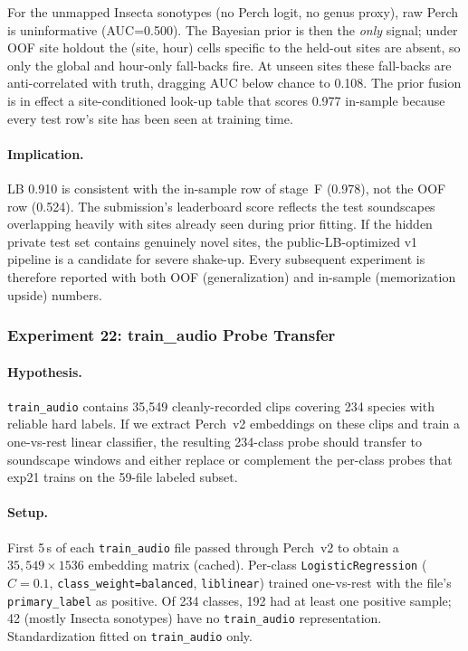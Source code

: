 For the unmapped Insecta sonotypes (no Perch logit, no genus proxy), raw
Perch is uninformative (AUC=0.500). The Bayesian prior is then the
\emph{only} signal; under OOF site holdout the (site, hour) cells specific
to the held-out sites are absent, so only the global and hour-only
fall-backs fire. At unseen sites these fall-backs are anti-correlated with
truth, dragging AUC below chance to 0.108. The prior fusion is in effect
a site-conditioned look-up table that scores 0.977 in-sample because every
test row's site has been seen at training time.

\paragraph{Implication.}
LB 0.910 is consistent with the in-sample row of stage~F (0.978), not the
OOF row (0.524). The submission's leaderboard score reflects the test
soundscapes overlapping heavily with sites already seen during prior
fitting. If the hidden private test set contains genuinely novel sites,
the public-LB-optimized v1 pipeline is a candidate for severe shake-up.
Every subsequent experiment is therefore reported with both OOF
(generalization) and in-sample (memorization upside) numbers.

\subsubsection{Experiment 22: train\_audio Probe Transfer}
\label{sec:exp22}

\paragraph{Hypothesis.}
\texttt{train\_audio} contains 35{,}549 cleanly-recorded clips covering
234 species with reliable hard labels. If we extract Perch~v2 embeddings
on these clips and train a one-vs-rest linear classifier, the resulting
234-class probe should transfer to soundscape windows and either replace
or complement the per-class probes that exp21 trains on the 59-file
labeled subset.

\paragraph{Setup.}
First 5\,s of each \texttt{train\_audio} file passed through Perch~v2 to
obtain a $35{,}549 \times 1536$ embedding matrix (cached). Per-class
\texttt{LogisticRegression} ($C{=}0.1$, \texttt{class\_weight=balanced},
\texttt{liblinear}) trained one-vs-rest with the file's
\texttt{primary\_label} as positive. Of 234 classes, 192 had at least one
positive sample; 42 (mostly Insecta sonotypes) have no \texttt{train\_audio}
representation. Standardization fitted on \texttt{train\_audio} only.

